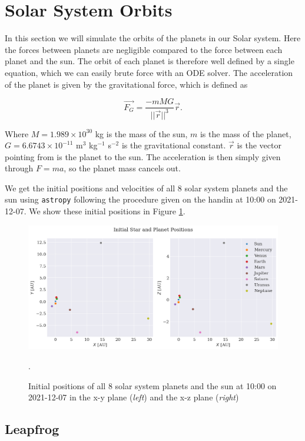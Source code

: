 \section{Solar System Orbits}

In this section we will simulate the orbits of the planets in our Solar system. Here the forces between planets are negligible compared to the force between each planet and the sun. The orbit of each planet is therefore well defined by a single equation, which we can easily brute force with an ODE solver. The acceleration of the planet is given by the gravitational force, which is defined as

\begin{equation}
    \vec{F_G} = \frac{-mMG}{||\vec{r}||^3} \vec{r}.
\end{equation}

Where $M = 1.989 \times 10^{30}$ kg is the mass of the sun, $m$ is the mass of the planet, $G = 6.6743 \times 10^{-11}$ m$^3$ kg$^{-1}$ s$^{-2}$ is the gravitational constant. $\vec{r}$ is the vector pointing from is the planet to the sun. The acceleration is then simply given through $F = ma$, so the planet mass cancels out.

We get the initial positions and velocities of all 8 solar system planets and the sun using \texttt{astropy} following the procedure given on the handin at 10:00 on 2021-12-07. We show these initial positions in Figure \ref{fig:initial_pos}.

\begin{figure}
    \centering
    \includegraphics[width=\textwidth]{results/initial_positions.png}
    \caption{Initial positions of all 8 solar system planets and the sun at 10:00 on 2021-12-07 in the x-y plane (\textit{left}) and the x-z plane (\textit{right})}. 
    \label{fig:initial_pos}
\end{figure}


\subsection{Leapfrog}

